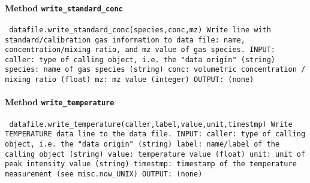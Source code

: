 \paragraph{Method \texttt{write_standard_conc}}
\vspace{1ex}
\texttt{\newline
datafile.write_standard_conc(species,conc,mz)\newline
\newline
Write line with standard/calibration gas information to data file: name, concentration/mixing ratio, and mz value of gas species.\newline
\newline
INPUT:\newline
caller: type of calling object, i.e. the "data origin" (string)\newline
species: name of gas species (string)\newline
conc: volumetric concentration / mixing ratio (float)\newline
mz: mz value (integer)\newline
\newline
OUTPUT:\newline
(none)\newline
\newline
}

\paragraph{Method \texttt{write_temperature}}
\vspace{1ex}
\texttt{\newline
datafile.write_temperature(caller,label,value,unit,timestmp)\newline
\newline
Write TEMPERATURE data line to the data file.\newline
\newline
INPUT:\newline
caller: type of calling object, i.e. the "data origin" (string)\newline
label: name/label of the calling object (string)\newline
value: temperature value (float)\newline
unit: unit of peak intensity value (string)\newline
timestmp: timestamp of the temperature measurement (see misc.now_UNIX)\newline
\newline
OUTPUT:\newline
(none)\newline
\newline
}

